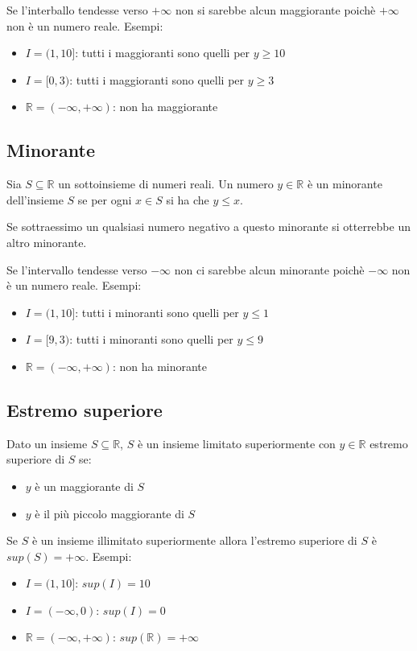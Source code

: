\documentclass[a4paper]{article}
\theoremstyle{break}
\theoremstyle{break}
\theoremstyle{break}
\theoremstyle{break}
\begin{document}
Se l'interballo tendesse verso \( +\infty \) non si sarebbe alcun maggiorante poichè \( +\infty \) non
è un numero reale. Esempi:
\begin{itemize}
	\item \( I = (1,10] \): tutti i maggioranti sono quelli per \( y \ge 10 \)
	\item \( I = [0,3) \): tutti i maggioranti sono quelli per \( y \ge 3 \)
	\item \( \mathbb{R} = (-\infty,+\infty) \): non ha maggiorante
\end{itemize}


\subsection{Minorante}
\begin{definition}
	Sia \( S \subseteq \mathbb{R}\) un sottoinsieme di numeri reali. Un numero \( y \in \mathbb{R} \)
	è un minorante dell'insieme \( S \) se per ogni \( x \in S \) si ha che \( y \le x \).
\end{definition}
Se sottraessimo un qualsiasi numero negativo a questo minorante si otterrebbe un altro minorante.

Se l'intervallo tendesse verso \( -\infty \) non ci sarebbe alcun minorante poichè \( -\infty \) non
è un numero reale. Esempi:
\begin{itemize}
	\item \( I = (1,10] \): tutti i minoranti sono quelli per \( y \le 1 \)
	\item \( I = [9,3) \): tutti i minoranti sono quelli per \( y \le 9 \)
	\item \( \mathbb{R} = (-\infty,+\infty) \): non ha minorante
\end{itemize}


\subsection{Estremo superiore}
Dato un insieme \( S \subseteq \mathbb{R} \), \( S \) è un insieme limitato superiormente con \( y \in \mathbb{R} \)
estremo superiore di \( S \) se:
\begin{itemize}
	\item \( y \) è un maggiorante di \( S \)
	\item \( y \) è il più piccolo maggiorante di \( S \)
\end{itemize}
Se \( S \) è un insieme illimitato superiormente allora l'estremo superiore di \( S \) è \( sup(S)=+\infty \).
Esempi:
\begin{itemize}
	\item \( I = (1,10] \): \( sup(I) = 10 \)
	\item \( I = (-\infty,0) \): \( sup(I) = 0 \)
	\item \( \mathbb{R} = (-\infty, +\infty) \): \( sup(\mathbb{R}) = +\infty \)
\end{itemize}
\end{document}
